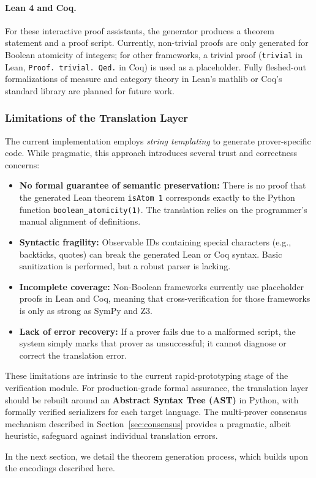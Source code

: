 \paragraph{Lean 4 and Coq.} For these interactive proof assistants, the generator produces a theorem statement and a proof script. Currently, non-trivial proofs are only generated for Boolean atomicity of integers; for other frameworks, a trivial proof (\texttt{trivial} in Lean, \texttt{Proof. trivial. Qed.} in Coq) is used as a placeholder. Fully fleshed-out formalizations of measure and category theory in Lean's mathlib or Coq's standard library are planned for future work.

\subsubsection{Limitations of the Translation Layer}

The current implementation employs \textit{string templating} to generate prover-specific code. While pragmatic, this approach introduces several trust and correctness concerns:

\begin{itemize}
    \item \textbf{No formal guarantee of semantic preservation:} There is no proof that the generated Lean theorem \texttt{isAtom 1} corresponds exactly to the Python function \texttt{boolean\_atomicity(1)}. The translation relies on the programmer's manual alignment of definitions.
    \item \textbf{Syntactic fragility:} Observable IDs containing special characters (e.g., backticks, quotes) can break the generated Lean or Coq syntax. Basic sanitization is performed, but a robust parser is lacking.
    \item \textbf{Incomplete coverage:} Non-Boolean frameworks currently use placeholder proofs in Lean and Coq, meaning that cross-verification for those frameworks is only as strong as SymPy and Z3.
    \item \textbf{Lack of error recovery:} If a prover fails due to a malformed script, the system simply marks that prover as unsuccessful; it cannot diagnose or correct the translation error.
\end{itemize}

These limitations are intrinsic to the current rapid-prototyping stage of the \Apeiron{} verification module. For production-grade formal assurance, the translation layer should be rebuilt around an \textbf{Abstract Syntax Tree (AST)} in Python, with formally verified serializers for each target language. The multi-prover consensus mechanism described in Section~\ref{sec:consensus} provides a pragmatic, albeit heuristic, safeguard against individual translation errors.

In the next section, we detail the theorem generation process, which builds upon the encodings described here.